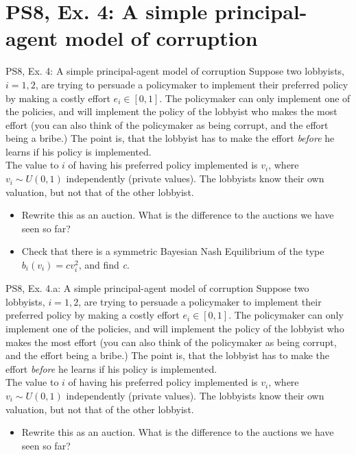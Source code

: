 \section{PS8, Ex. 4: A simple principal-agent model of corruption}

\begin{frame}{PS8, Ex. 4: A simple principal-agent model of corruption}
    Suppose two lobbyists, $i = 1, 2$, are trying to persuade a policymaker to implement their preferred policy by making a costly effort $e_i\in[0, 1]$. The policymaker can only implement one of the policies, and will implement the policy of the lobbyist who makes the most effort (you can also think of the policymaker as being corrupt, and the effort being a bribe.) The point is, that the lobbyist has to make the effort \textit{before} he learns if his policy is implemented.\\\medskip
    The value to $i$ of having his preferred policy implemented is $v_i$, where $v_i\sim U(0, 1)$ independently (private values). The lobbyists know their own valuation, but not that of the other lobbyist.
    \begin{itemize}
      \item[(a)] Rewrite this as an auction. What is the difference to the auctions we have seen so far?
      \item[(b)] Check that there is a symmetric Bayesian Nash Equilibrium of the type $b_i(v_i) = cv_i^2$, and find \textit{c}.
    \end{itemize}
\end{frame}

\begin{frame}{PS8, Ex. 4.a: A simple principal-agent model of corruption}
    Suppose two lobbyists, $i = 1, 2$, are trying to persuade a policymaker to implement their preferred policy by making a costly effort $e_i\in[0, 1]$. The policymaker can only implement one of the policies, and will implement the policy of the lobbyist who makes the most effort (you can also think of the policymaker as being corrupt, and the effort being a bribe.) The point is, that the lobbyist has to make the effort \textit{before} he learns if his policy is implemented.\\\medskip
    The value to $i$ of having his preferred policy implemented is $v_i$, where $v_i\sim U(0, 1)$ independently (private values). The lobbyists know their own valuation, but not that of the other lobbyist.
    \begin{itemize}
      \item[(a)] Rewrite this as an auction. What is the difference to the auctions we have seen so far?
    \end{itemize}
    \vspace{-8pt}
    \begin{multicols}{2}
      \vfill\null\columnbreak
      \vfill\null
    \end{multicols}
\end{frame}

